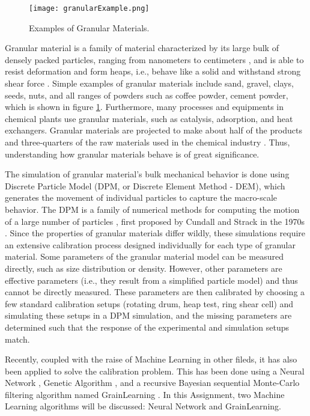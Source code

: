 
\begin{figure}[H]
    \centering
    \texttt{[image: granularExample.png]}
    \caption{Examples of Granular Materials.\cite{granularExample}}
    \label{fig:granularExample}
\end{figure}

Granular material is a family of material characterized by its large bulk of densely packed particles, ranging from nanometers to centimeters \cite{introGranular2}, and is able to resist deformation and form heaps, i.e., behave like a solid and withstand strong shear force \cite{introGranular3}. Simple examples of granular materials include sand, gravel, clays, seeds, nuts, and all ranges of powders such as coffee powder, cement powder, which is shown in figure \ref{fig:granularExample}. Furthermore, many processes and equipments in chemical plants use granular materials, such as catalysis, adsorption, and heat exchangers. Granular materials are projected to make about half of the products and three-quarters of the raw materials used in the chemical industry \cite{introGranular}. Thus, understanding how granular materials behave is of great significance. 

The simulation of granular material's bulk mechanical behavior is done using Discrete Particle Model (DPM, or Discrete Element Method - DEM), which generates the movement of individual particles to capture the macro-scale behavior. The DPM is a family of numerical methods for computing the motion of a large number of particles \cite{Weng:2015}, first proposed by Cundall and Strack in the 1970s \cite{cundallstrack}.
Since the properties of granular materials differ wildly, these simulations require an extensive calibration process designed individually for each type of granular material. Some parameters of the granular material model can be measured directly, such as size distribution or density. However, other parameters are effective parameters (i.e., they result from a simplified particle model) and thus cannot be directly measured. These parameters are then calibrated by choosing a few standard calibration setups (rotating drum, heap test, ring shear cell) and simulating these setups in a DPM simulation, and the missing parameters are determined such that the response of the experimental and simulation setups match.

Recently, coupled with the raise of Machine Learning in other fileds, it has also been applied to solve the calibration problem. This has been done using a Neural Network \cite{nn-calibration, NN-GA, NN-coarse}, Genetic Algorithm \cite{ga-calibration}, and a recursive Bayesian sequential Monte-Carlo filtering algorithm named GrainLearning \cite{grainLearning}. In this Assignment, two Machine Learning algorithms will be discussed: Neural Network and GrainLearning. 

